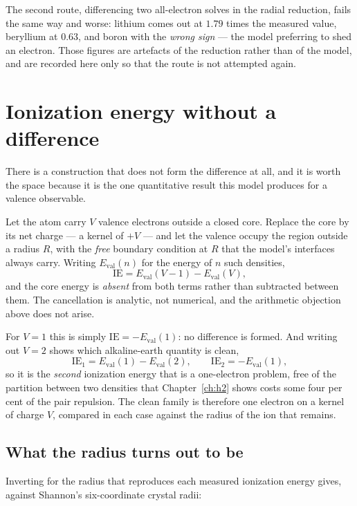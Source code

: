 The second route, differencing two all-electron solves in the radial reduction, fails the same way
and worse: lithium comes out at $1.79$ times the measured value, beryllium at $0.63$, and boron
with the \emph{wrong sign} --- the model preferring to shed an electron. Those figures are
artefacts of the reduction rather than of the model, and are recorded here only so that the route
is not attempted again.

\section{Ionization energy without a difference}\label{sec:ie-screened}

There is a construction that does not form the difference at all, and it is worth the space
because it is the one quantitative result this model produces for a valence observable.

Let the atom carry $V$ valence electrons outside a closed core. Replace the core by its net
charge --- a kernel of $+V$ --- and let the valence occupy the region outside a radius $R$, with
the \emph{free} boundary condition at $R$ that the model's interfaces always carry. Writing
$E_{\mathrm{val}}(n)$ for the energy of $n$ such densities,
\[
\mathrm{IE} = E_{\mathrm{val}}(V-1) - E_{\mathrm{val}}(V),
\]
and the core energy is \emph{absent} from both terms rather than subtracted between them. The
cancellation is analytic, not numerical, and the arithmetic objection above does not arise.

For $V=1$ this is simply $\mathrm{IE} = -E_{\mathrm{val}}(1)$: no difference is formed. And
writing out $V=2$ shows which alkaline-earth quantity is clean,
\[
\mathrm{IE}_1 = E_{\mathrm{val}}(1)-E_{\mathrm{val}}(2), \qquad
\mathrm{IE}_2 = -E_{\mathrm{val}}(1),
\]
so it is the \emph{second} ionization energy that is a one-electron problem, free of the
partition between two densities that Chapter~\ref{ch:h2} shows costs some four per cent of the
pair repulsion. The clean family is therefore one electron on a kernel of charge $V$, compared
in each case against the radius of the ion that remains.

\subsection*{What the radius turns out to be}

Inverting for the radius that reproduces each measured ionization energy gives, against Shannon's
six-coordinate crystal radii:

